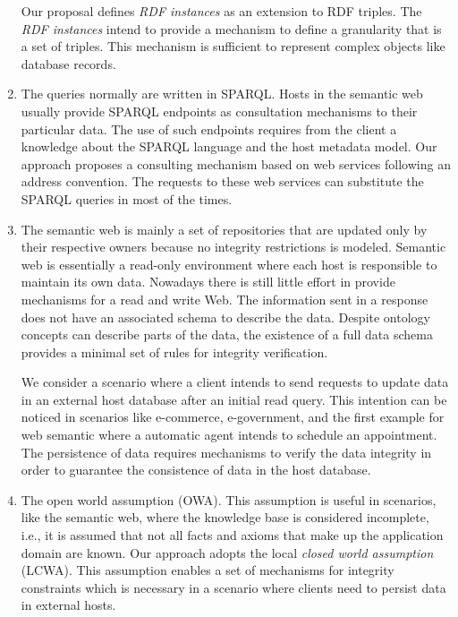 \documentclass{singlecol-new}
\theoremstyle{TH}{
\newtheorem{lemma}{Lemma}
\newtheorem{theorem}[lemma]{Theorem}
\newtheorem{corrolary}[lemma]{Corrolary}
\newtheorem{conjecture}[lemma]{Conjecture}
\newtheorem{proposition}[lemma]{Proposition}
\newtheorem{claim}[lemma]{Claim}
\newtheorem{stheorem}[lemma]{Wrong Theorem}
\newtheorem{algorithm}{Algorithm}
}
\theoremstyle{THrm}{
\newtheorem{definition}{Definition}[section]
\newtheorem{question}{Question}[section]
\newtheorem{remark}{Remark}
\newtheorem{scheme}{Scheme}
}
\theoremstyle{THhit}{
\newtheorem{case}{Case}[section]
}
\begin{document}
\begin{enumerate}
	Our proposal defines \textit{RDF instances} as an extension to RDF triples. The \textit{RDF instances} intend to provide a mechanism to define a granularity that is a set of triples. This mechanism is sufficient to represent complex objects like database records.    
	\item The queries normally are written in SPARQL. Hosts in the semantic web usually provide SPARQL endpoints as consultation mechanisms to their particular data. The use of such endpoints requires from the client a knowledge about the SPARQL language and the host metadata model. Our approach proposes a consulting mechanism based on web services following an address convention. The requests to these web services can substitute the SPARQL queries in most of the times. 
	\item The semantic web is mainly a set of repositories that are updated only by their respective owners because no integrity restrictions is modeled. Semantic web is essentially a read-only environment where each host is responsible to maintain its own data. Nowadays there is still little effort in provide mechanisms for a read and write Web.
	The information sent in a response does not have an associated schema to describe the data. 
	Despite ontology concepts can describe parts of the data, the existence of a full data schema provides a minimal set of rules for integrity verification.
	
	We consider a scenario where a client intends to send requests to update data in an external host database after an initial read query. This intention can be noticed in scenarios like e-commerce, e-government, and the first example for web semantic where a automatic agent intends to schedule an appointment. 
	The persistence of data requires mechanisms to verify the data integrity in order to guarantee the consistence of data in the host database.  
	\item The open world assumption (OWA). This assumption is useful in scenarios, like the semantic web, where the knowledge base is considered incomplete, i.e., it is assumed that not all facts and axioms that make up the application domain are known.
	Our approach adopts the local \textit{closed world assumption} (LCWA). This assumption enables a set of mechanisms for integrity constraints which is necessary in a scenario where clients need to persist data in external hosts.
\end{enumerate}
\end{document}
